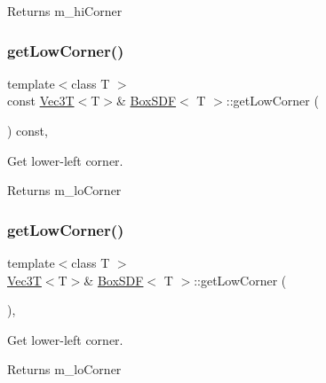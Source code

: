 \begin{DoxyReturn}{Returns}
m\+\_\+hi\+Corner 
\end{DoxyReturn}
\mbox{\label{classBoxSDF_a564b5f203d6bec78be94da4b9119748a}} 
\subsubsection{\texorpdfstring{get\+Low\+Corner()}{getLowCorner()}\hspace{0.1cm}{\footnotesize\ttfamily [1/2]}}
{\footnotesize\ttfamily template$<$class T $>$ \\
const \hyperlink{classVec3T}{Vec3T}$<$T$>$\& \hyperlink{classBoxSDF}{Box\+S\+DF}$<$ T $>$\+::get\+Low\+Corner (\begin{DoxyParamCaption}{ }\end{DoxyParamCaption}) const\hspace{0.3cm}{\ttfamily [inline]}, {\ttfamily [noexcept]}}



Get lower-\/left corner. 

\begin{DoxyReturn}{Returns}
m\+\_\+lo\+Corner 
\end{DoxyReturn}
\mbox{\label{classBoxSDF_aa4ce24307fa921d36527ae4a8d6c0b36}} 
\subsubsection{\texorpdfstring{get\+Low\+Corner()}{getLowCorner()}\hspace{0.1cm}{\footnotesize\ttfamily [2/2]}}
{\footnotesize\ttfamily template$<$class T $>$ \\
\hyperlink{classVec3T}{Vec3T}$<$T$>$\& \hyperlink{classBoxSDF}{Box\+S\+DF}$<$ T $>$\+::get\+Low\+Corner (\begin{DoxyParamCaption}{ }\end{DoxyParamCaption})\hspace{0.3cm}{\ttfamily [inline]}, {\ttfamily [noexcept]}}



Get lower-\/left corner. 

\begin{DoxyReturn}{Returns}
m\+\_\+lo\+Corner 
\end{DoxyReturn}
\mbox{\label{classBoxSDF_a6e7a72790061423e5c9ea47d9e26736f}} 
